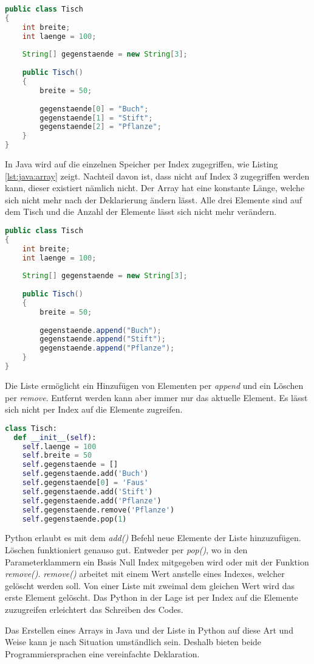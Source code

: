 \begin{lstlisting}[language=java,caption={Array in Java},captionpos=b,label={lst:java:array}]
public class Tisch
{
    int breite;
    int laenge = 100;
  
    String[] gegenstaende = new String[3];
  
    public Tisch()
    {
        breite = 50;
    
        gegenstaende[0] = "Buch";
        gegenstaende[1] = "Stift";
        gegenstaende[2] = "Pflanze";
    }
}
\end{lstlisting}

In Java wird auf die einzelnen Speicher per Index zugegriffen, wie Listing \ref{lst:java:array} zeigt. Nachteil davon ist, dass nicht auf Index 3 zugegriffen werden kann, dieser existiert nämlich nicht. Der Array hat eine konstante Länge, welche sich nicht mehr nach der Deklarierung ändern lässt. Alle drei Elemente sind auf dem Tisch und die Anzahl der Elemente lässt sich nicht mehr verändern.

\begin{lstlisting}[language=java,caption={Liste in Java},captionpos=b,label={lst:java:liste}]
public class Tisch
{
    int breite;
    int laenge = 100;
  
    String[] gegenstaende = new String[3];
  
    public Tisch()
    {
        breite = 50;
    
        gegenstaende.append("Buch");
        gegenstaende.append("Stift");
        gegenstaende.append("Pflanze");
    }
}
\end{lstlisting}

Die Liste ermöglicht ein Hinzufügen von Elementen per \textit{append} und ein Löschen per \textit{remove}. Entfernt werden kann aber immer nur das aktuelle Element. Es lässt sich nicht per Index auf die Elemente zugreifen.

\begin{lstlisting}[language=python,caption={Liste in Python},captionpos=b,label={lst:python:liste}]
class Tisch:
  def __init__(self):
    self.laenge = 100
    self.breite = 50
    self.gegenstaende = []
    self.gegenstaende.add('Buch')
    self.gegenstaende[0] = 'Faus'
    self.gegenstaende.add('Stift')
    self.gegenstaende.add('Pflanze')
    self.gegenstaende.remove('Pflanze')
    self.gegenstaende.pop(1)
\end{lstlisting}

Python erlaubt es mit dem \textit{add()} Befehl neue Elemente der Liste hinzuzufügen. Löschen funktioniert genauso gut. Entweder per \textit{pop()}, wo in den Parameterklammern ein Basis Null Index mitgegeben wird oder mit der Funktion \textit{remove()}. \textit{remove()} arbeitet mit einem Wert anstelle eines Indexes, welcher gelöscht werden soll. Von einer Liste mit zweimal dem gleichen Wert wird das erste Element gelöscht. Das Python in der Lage ist per Index auf die Elemente zuzugreifen erleichtert das Schreiben des Codes.\par
Das Erstellen eines Arrays in Java und der Liste in Python auf diese Art und Weise kann je nach Situation umständlich sein. Deshalb bieten beide Programmiersprachen eine vereinfachte Deklaration.\newpage

